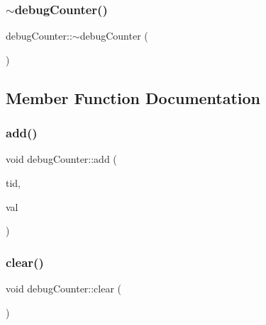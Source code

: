 \mbox{\label{classdebugCounter_aa2eea12ef30fa671d4ee30d32caac190}} 
\subsubsection{\texorpdfstring{$\sim$debug\+Counter()}{~debugCounter()}}
{\footnotesize\ttfamily debug\+Counter\+::$\sim$debug\+Counter (\begin{DoxyParamCaption}{ }\end{DoxyParamCaption})\hspace{0.3cm}{\ttfamily [inline]}}



\subsection{Member Function Documentation}
\mbox{\label{classdebugCounter_a27a5b024a98aa03068ebca776256d2b9}} 
\subsubsection{\texorpdfstring{add()}{add()}}
{\footnotesize\ttfamily void debug\+Counter\+::add (\begin{DoxyParamCaption}\item[{const int}]{tid,  }\item[{const long long}]{val }\end{DoxyParamCaption})\hspace{0.3cm}{\ttfamily [inline]}}

\mbox{\label{classdebugCounter_a9c6bfef91b842103ddac1c6a22247209}} 
\subsubsection{\texorpdfstring{clear()}{clear()}}
{\footnotesize\ttfamily void debug\+Counter\+::clear (\begin{DoxyParamCaption}{ }\end{DoxyParamCaption})\hspace{0.3cm}{\ttfamily [inline]}}

